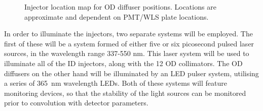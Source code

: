 \documentclass[a4paper,11pt]{article}
\begin{document}
\begin{figure}[h!]
\centering
{}
\caption{Injector location map for OD diffuser positions. Locations are approximate and dependent on PMT/WLS plate locations.}\label{fig:ODdiffmap}
\end{figure}

In order to illuminate the injectors, two separate systems will be employed. The first of these will be a system formed of either five or six picosecond pulsed laser sources, in the wavelength range 337-550 nm. This laser system will be used to illuminate all of the ID injectors, along with the 12 OD collimators. The OD diffusers on the other hand will be illuminated by an LED pulser system, utilising a series of 365~nm wavelength LEDs. Both of these systems will feature monitoring devices, so that the stability of the light sources can be monitored prior to convolution with detector parameters.
\end{document}
